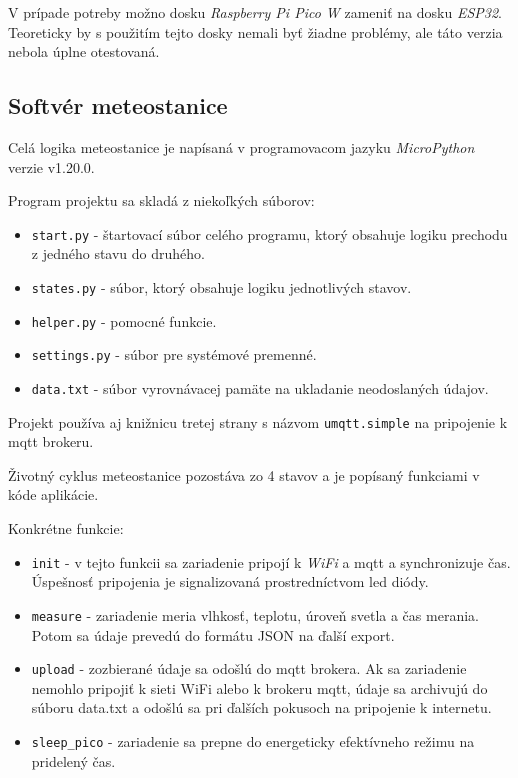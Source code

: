 V prípade potreby možno dosku \textit{Raspberry Pi Pico W} zameniť na dosku \textit{ESP32}. Teoreticky by s použitím tejto dosky nemali byť žiadne problémy, ale táto verzia nebola úplne otestovaná.

\subsection{Softvér meteostanice}
Celá logika meteostanice je napísaná v programovacom jazyku \textit{MicroPython} verzie v1.20.0. 

Program projektu sa skladá z niekoľkých súborov:
\begin{itemize}
    \item \verb|start.py| - štartovací súbor celého programu, ktorý obsahuje logiku prechodu z jedného stavu do druhého.
    \item \verb|states.py| - súbor, ktorý obsahuje logiku jednotlivých stavov. 
    \item \verb|helper.py| - pomocné funkcie. 
    \item \verb|settings.py| - súbor pre systémové premenné. 
    \item \verb|data.txt| - súbor vyrovnávacej pamäte na ukladanie neodoslaných údajov.
\end{itemize}
Projekt používa aj knižnicu tretej strany s názvom \verb|umqtt.simple| na pripojenie k \gls{mqtt} brokeru. 

Životný cyklus meteostanice pozostáva zo 4 stavov a je popísaný funkciami v kóde aplikácie.

Konkrétne funkcie:

\begin{itemize}
    \item \verb|init| - v tejto funkcii sa zariadenie pripojí k \textit{WiFi} a \gls{mqtt} a synchronizuje čas. Úspešnosť pripojenia je signalizovaná prostredníctvom \gls{led} diódy. 
    \item \verb|measure| - zariadenie meria vlhkosť, teplotu, úroveň svetla a čas merania. Potom sa údaje prevedú do formátu JSON na ďalší export.
    \item \verb|upload| - zozbierané údaje sa odošlú do \gls{mqtt} brokera. Ak sa zariadenie nemohlo pripojiť k sieti WiFi alebo k brokeru \gls{mqtt}, údaje sa archivujú do súboru data.txt a odošlú sa pri ďalších pokusoch na pripojenie k internetu. 
    \item \verb|sleep_pico| - zariadenie sa prepne do energeticky efektívneho režimu na pridelený čas.
\end{itemize}

